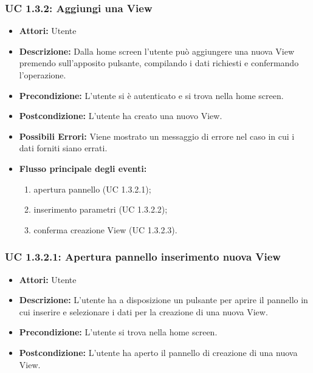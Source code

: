 \subsubsection{UC 1.3.2: Aggiungi una View}

\begin{itemize}
    \item \textbf{Attori:} Utente
    \item \textbf{Descrizione:} Dalla home screen l'utente può aggiungere una nuova View premendo sull'apposito pulsante, compilando i dati richiesti e confermando l'operazione.
    \item \textbf{Precondizione:} L'utente si è autenticato e si trova nella home screen.
    \item \textbf{Postcondizione:} L'utente ha creato una nuovo View.
	\item \textbf{Possibili Errori:}
    Viene mostrato un messaggio di errore nel caso in cui i dati forniti siano errati.
    \item \textbf{Flusso principale degli eventi:}
    
    \begin{enumerate}
        \item apertura pannello (UC 1.3.2.1);
        \item inserimento parametri (UC 1.3.2.2);
        \item conferma creazione View (UC 1.3.2.3).
    \end{enumerate}

\end{itemize}

\subsubsection{UC 1.3.2.1: Apertura pannello inserimento nuova View}

\begin{itemize}
    \item \textbf{Attori:} Utente
    \item \textbf{Descrizione:} L'utente ha a disposizione un pulsante per aprire il pannello in cui inserire e selezionare i dati per la creazione di una nuova View.
    \item \textbf{Precondizione:} L'utente si trova nella home screen.
    \item \textbf{Postcondizione:} L'utente ha aperto il pannello di creazione di una nuova View.
\end{itemize}

